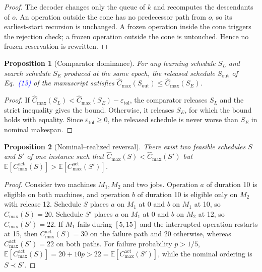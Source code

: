 \documentclass[conference]{IEEEtran}
\newtheorem{proposition}{Proposition}
\theoremstyle{remark}
\begin{document}
\begin{proof}
The decoder changes only the queue of $k$ and recomputes the descendants of $o$. An operation outside the cone has no predecessor path from $o$, so its earliest-start recursion is unchanged. A frozen operation inside the cone triggers the rejection check; a frozen operation outside the cone is untouched. Hence no frozen reservation is rewritten.
\end{proof}

\begin{proposition}[Comparator dominance]
\label{prop:S-comparator}
For any learning schedule $S_L$ and search schedule $S_E$ produced at the same epoch, the released schedule $S_{\mathrm{out}}$ of Eq.~\textcolor{blue}{(13)} of the manuscript satisfies $\hat{C}_{\max}(S_{\mathrm{out}})\le\hat{C}_{\max}(S_E)$.
\end{proposition}

\begin{proof}
If $\hat{C}_{\max}(S_L)<\hat{C}_{\max}(S_E)-\varepsilon_{\mathrm{tol}}$, the comparator releases $S_L$ and the strict inequality gives the bound. Otherwise, it releases $S_E$, for which the bound holds with equality. Since $\varepsilon_{\mathrm{tol}}\ge0$, the released schedule is never worse than $S_E$ in nominal makespan.
\end{proof}

\begin{proposition}[Nominal--realized reversal]
\label{prop:S-reversal}
There exist two feasible schedules $S$ and $S'$ of one instance such that $\hat{C}_{\max}(S)<\hat{C}_{\max}(S')$ but $\mathbb{E}[C_{\max}^{\mathrm{act}}(S)]>\mathbb{E}[C_{\max}^{\mathrm{act}}(S')]$.
\end{proposition}

\begin{proof}
Consider two machines $M_1,M_2$ and two jobs. Operation $a$ of duration 10 is eligible on both machines, and operation $b$ of duration 10 is eligible only on $M_2$ with release 12. Schedule $S$ places $a$ on $M_1$ at 0 and $b$ on $M_1$ at 10, so $\hat{C}_{\max}(S)=20$. Schedule $S'$ places $a$ on $M_1$ at 0 and $b$ on $M_2$ at 12, so $\hat{C}_{\max}(S')=22$. If $M_1$ fails during $[5,15]$ and the interrupted operation restarts at 15, then $C_{\max}^{\mathrm{act}}(S)=30$ on the failure path and 20 otherwise, whereas $C_{\max}^{\mathrm{act}}(S')=22$ on both paths. For failure probability $p>1/5$, $\mathbb{E}[C_{\max}^{\mathrm{act}}(S)]=20+10p>22=\mathbb{E}[C_{\max}^{\mathrm{act}}(S')]$, while the nominal ordering is $S\prec S'$.
\end{proof}
\end{document}
